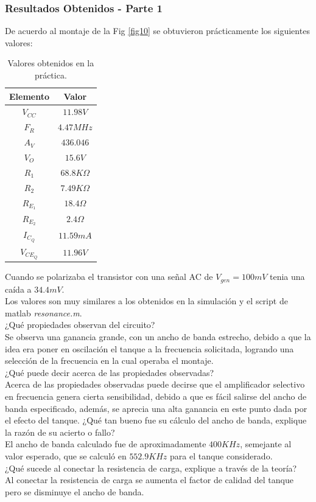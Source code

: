 \documentclass[11pt,graphicx,caption,rotating]{article}
\begin{document}
\subsubsection{Resultados Obtenidos - Parte 1}
\noindent
De acuerdo al montaje de la Fig \ref{fig10} se obtuvieron prácticamente los siguientes valores:
\begin{table}[H]
	\centering
\begin{tabular}{|c|c|}\hline
 \textbf{Elemento} & \textbf{Valor} \\ \hline
 $V_{CC}$ & $11.98V$ \\ \hline
 $F_R$ & $4.47MHz$ \\ \hline
 $A_V$ & $436.046$ \\ \hline
 $V_O$ & $15.6V$ \\ \hline
 $R_1$ & $68.8K\Omega$ \\ \hline
 $R_2$ & $7.49K\Omega$ \\ \hline
 $R_{E_1}$ & $18.4\Omega$ \\ \hline
 $R_{E_2}$ & $2.4\Omega$ \\ \hline
 $I_{C_Q}$ & $11.59mA$ \\ \hline
 $V_{CE_Q}$ & $11.96V$ \\ \hline
    \end{tabular}
	\caption{Valores obtenidos en la práctica.}
	\label{tab3}
\end{table}
\noindent
Cuando se polarizaba el transistor con una señal AC de $V_{gen}= 100 mV$ tenia una caída a $34.4 mV$.\\
Los valores son muy similares a los obtenidos en la simulación y el script de matlab \textit{resonance.m}.\\
¿Qué propiedades observan del circuito?\\
Se observa una ganancia grande, con un ancho de banda estrecho,  debido a que la idea era poner en oscilación el tanque a la frecuencia solicitada, logrando una selección de la frecuencia en la cual operaba el montaje.\\
¿Qué puede decir acerca de las propiedades observadas?\\
Acerca de las propiedades observadas puede decirse que el amplificador selectivo en frecuencia genera  cierta sensibilidad, debido a que es fácil salirse del ancho de banda especificado, además, se aprecia una alta ganancia en este punto dada por el efecto del tanque.
¿Qué tan bueno fue su cálculo del ancho de banda, explique la razón de su acierto o fallo?\\
El ancho de banda calculado fue de aproximadamente $400KHz$, semejante al valor esperado, que se calculó en $552.9KHz$ para el tanque considerado.\\
¿Qué sucede al conectar la resistencia de carga, explique a través de la teoría?\\
Al conectar la resistencia de carga se aumenta el factor de calidad del tanque pero se disminuye el ancho de banda.\\
\end{document}
